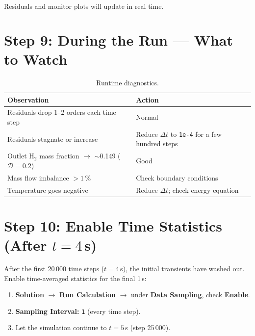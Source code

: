 \documentclass[12pt,a4paper]{report}
\begin{document}
Residuals and monitor plots will update in real time.

\section{Step 9: During the Run --- What to Watch}

\begin{table}[H]
\centering
\caption{Runtime diagnostics.}
\label{tab:diagnostics}
\begin{tabular}{@{}ll@{}}
\toprule
\textbf{Observation} & \textbf{Action} \\
\midrule
Residuals drop 1--2 orders each time step & Normal \\
Residuals stagnate or increase & Reduce $\Delta t$ to \texttt{1e-4}
  for a few hundred steps \\
Outlet H$_2$ mass fraction $\to$ $\sim$0.149 ($\mathcal{D}=0.2$) & Good \\
Mass flow imbalance $> 1$\,\% & Check boundary conditions \\
Temperature goes negative & Reduce $\Delta t$; check energy equation \\
\bottomrule
\end{tabular}
\end{table}

\section{Step 10: Enable Time Statistics (After $t = 4$\,s)}

After the first 20\,000 time steps ($t = 4$\,s), the initial
transients have washed out.  Enable time-averaged statistics for the
final 1\,s:

\begin{enumerate}
  \item \textbf{Solution} $\rightarrow$ \textbf{Run Calculation}
        $\rightarrow$ under \textbf{Data Sampling}, check
        \textbf{Enable}.
  \item \textbf{Sampling Interval:} \texttt{1} (every time step).
  \item Let the simulation continue to $t = 5$\,s (step 25\,000).
\end{enumerate}
\end{document}
